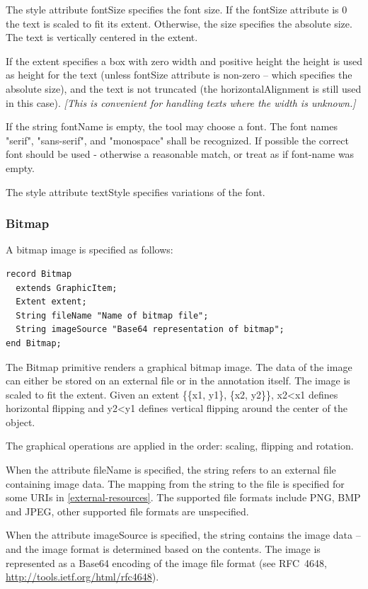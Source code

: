 \documentclass[10pt,a4paper]{report}
\def\doublelabel#1{\label{#1}\hypertarget{#1}{}}
\begin{document}
The style attribute fontSize specifies the font size. If the fontSize
attribute is 0 the text is scaled to fit its extent. Otherwise, the size
specifies the absolute size. The text is vertically centered in the
extent.

If the extent specifies a box with zero width and positive height the
height is used as height for the text (unless fontSize attribute is
non-zero -- which specifies the absolute size), and the text is not
truncated (the horizontalAlignment is still used in this case).
\emph{{[}This is convenient for handling texts where the width is
unknown.{]}}

If the string fontName is empty, the tool may choose a font. The font
names "serif", "sans-serif", and "monospace" shall be recognized. If
possible the correct font should be used - otherwise a reasonable match,
or treat as if font-name was empty.

The style attribute textStyle specifies variations of the font.

\subsubsection{Bitmap}\doublelabel{bitmap}

A bitmap image is specified as follows:

\begin{lstlisting}[language=modelica]
record Bitmap
  extends GraphicItem;
  Extent extent;
  String fileName "Name of bitmap file";
  String imageSource "Base64 representation of bitmap";
end Bitmap;
\end{lstlisting}
The Bitmap primitive renders a graphical bitmap image. The data of the
image can either be stored on an external file or in the annotation
itself. The image is scaled to fit the extent. Given an extent \{\{x1,
y1\}, \{x2, y2\}\}, x2\textless{}x1 defines horizontal flipping and
y2\textless{}y1 defines vertical flipping around the center of the
object.

The graphical operations are applied in the order: scaling, flipping and
rotation.

When the attribute fileName is specified, the string refers to an
external file containing image data. The mapping from the string to the
file is specified for some URIs in \ref{external-resources}. The supported file
formats include PNG, BMP and JPEG, other supported file formats are
unspecified.

When the attribute imageSource is specified, the string contains the
image data -- and the image format is determined based on the contents.
The image is represented as a Base64 encoding of the image file format
(see RFC~4648, \url{http://tools.ietf.org/html/rfc4648}).
\end{document}
